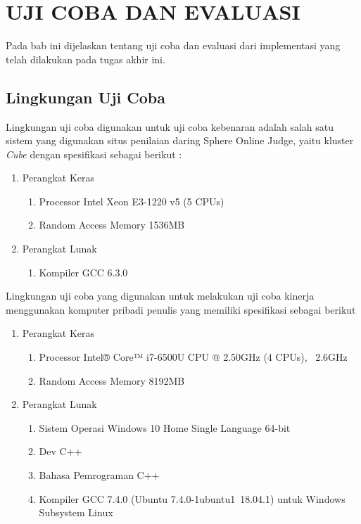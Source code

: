 \chapter{UJI COBA DAN EVALUASI}

Pada bab ini dijelaskan tentang uji coba dan evaluasi dari implementasi yang telah dilakukan pada tugas akhir ini.
\section{Lingkungan Uji Coba}
Lingkungan uji coba digunakan untuk uji coba kebenaran adalah salah satu sistem yang digunakan situs penilaian daring Sphere Online Judge, yaitu kluster \textit{Cube} dengan spesifikasi sebagai berikut :
\begin{enumerate}
	\item Perangkat Keras
	\begin{enumerate}
		\item Processor Intel Xeon E3-1220 v5 (5 CPUs)
		\item Random Access Memory 1536MB
	\end{enumerate}
	\item Perangkat Lunak
	\begin{enumerate}
		\item Kompiler GCC 6.3.0
	\end{enumerate}
\end{enumerate}

Lingkungan uji coba yang digunakan untuk melakukan uji coba kinerja menggunakan komputer pribadi penulis yang memiliki spesifikasi sebagai berikut
\begin{enumerate}
	\item Perangkat Keras
	\begin{enumerate}
		\item Processor Intel® Core™ i7-6500U CPU @ 2.50GHz (4 CPUs), ~2.6GHz
		\item Random Access Memory 8192MB
	\end{enumerate}
	\item Perangkat Lunak
	\begin{enumerate}
		\item Sistem Operasi Windows 10 Home Single Language 64-bit
		\item Dev C++
		\item Bahasa Pemrograman C++
		\item Kompiler GCC 7.4.0 (Ubuntu 7.4.0-1ubuntu1~18.04.1) untuk Windows Subsystem Linux
	\end{enumerate}
\end{enumerate}

